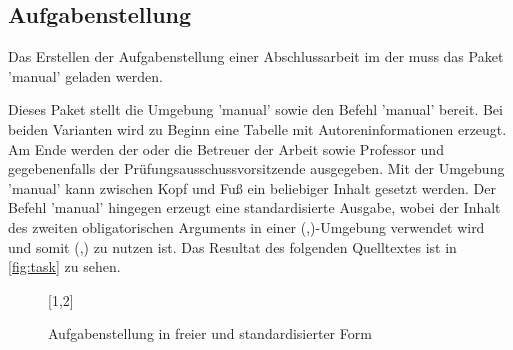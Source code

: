 \documentclass[%
  english,ngerman,%
  cdgeometry=no,DIV=12,%
  cd=false,cdfont=false,cdtitle=true,%
  headings=normal,%
  automark,%
  listof=toc,%
]{tudscrartcl}
\begin{document}
\subsection{Aufgabenstellung}
\label{sec:task}%
%
Das Erstellen der Aufgabenstellung einer Abschlussarbeit im \CD der \TnUD muss 
das Paket 'manual' geladen werden.
%
\begin{Preamble}
\usepackage{tudscrsupervisor}

\end{Preamble}
%
Dieses Paket stellt die Umgebung 'manual' sowie den Befehl 
'manual' bereit. Bei beiden Varianten wird zu Beginn eine 
Tabelle mit Autoreninformationen erzeugt. Am Ende werden der oder die Betreuer 
der Arbeit sowie Professor und gegebenenfalls der Prüfungsausschussvorsitzende 
ausgegeben. Mit der Umgebung 'manual' kann zwischen Kopf und 
Fuß ein beliebiger Inhalt gesetzt werden. Der Befehl 'manual' 
hingegen erzeugt eine standardisierte Ausgabe, wobei der Inhalt des zweiten 
obligatorischen Arguments in einer 
(,)-Umgebung 
verwendet wird und somit (,)
zu nutzen ist. Das Resultat des folgenden Quelltextes ist in \autoref{fig:task} 
zu sehen. 
%
\begin{figure}
[1,2]
\caption{Aufgabenstellung in freier und standardisierter Form}
\label{fig:task}
\end{figure}
\end{document}
